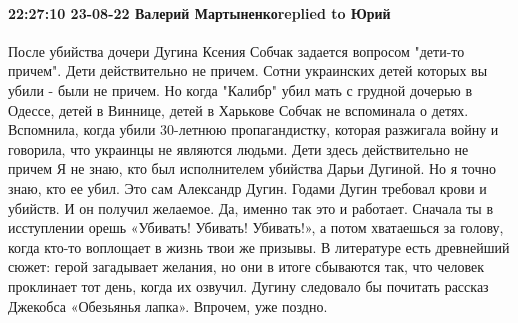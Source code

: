  
 
 
 
 

\paragraph{22:27:10 23-08-22 Валерий Мартыненкоreplied to Юрий}

После убийства дочери Дугина Ксения Собчак задается вопросом "дети-то причем".
Дети действительно не причем. Сотни украинских детей которых вы убили - были не причем. Но когда "Калибр" убил мать с грудной дочерью в Одессе, детей в Виннице, детей в Харькове Собчак не вспоминала о детях.
Вспомнила, когда убили 30-летнюю пропагандистку, которая разжигала войну и говорила, что украинцы не являются людьми.
Дети здесь действительно не причем
Я не знаю, кто был исполнителем убийства Дарьи Дугиной. Но я точно знаю, кто ее убил. Это сам Александр Дугин.
Годами Дугин требовал крови и убийств. И он получил желаемое.
Да, именно так это и работает. Сначала ты в исступлении орешь «Убивать! Убивать! Убивать!», а потом хватаешься за голову, когда кто-то воплощает в жизнь твои же призывы.
В литературе есть древнейший сюжет: герой загадывает желания, но они в итоге сбываются так, что человек проклинает тот день, когда их озвучил. Дугину следовало бы почитать рассказ Джекобса «Обезьянья лапка». Впрочем, уже поздно.

